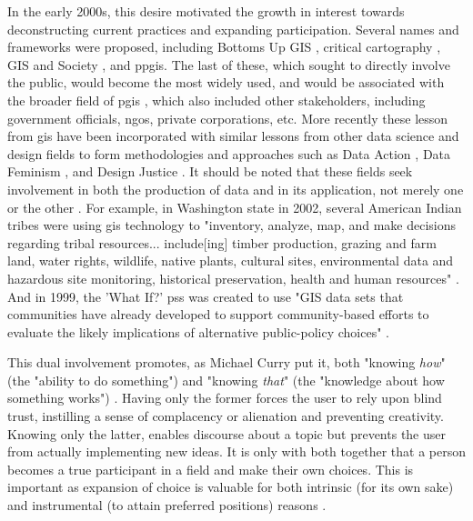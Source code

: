 In the early 2000s, this desire motivated the growth in interest towards deconstructing current practices and expanding participation. Several names and frameworks were proposed, including Bottoms Up GIS \cite{talenBottomUpGIS2000}, critical cartography \cite{cramptonIntroductionCriticalCartography2005, kimCriticalCartographyParticipatory2015}, GIS and Society \cite{sieberPublicParticipationGeographic2006}, and \ac{ppgis}. The last of these, which sought to directly involve the public, would become the most widely used, and would be associated with the broader field of \ac{pgis} \cite{sieberPublicParticipationGeographic2006}, which also included other stakeholders, including government officials, \acp{ngo}, private corporations, etc. More recently these lesson from \ac{gis} have been incorporated with similar lessons from other data science and design fields to form methodologies and approaches such as Data Action \cite{williamsDataActionUsing2020}, Data Feminism \cite{dignazioDataFeminism2020}, and Design Justice \cite{costanza-chockDesignJusticeCommunityLed2020}. It should be noted that these fields seek involvement in both the production of data and in its application, not merely one or the other \cite{weinerParticipatoryGeographicInformation2007, talenBottomUpGIS2000}. For example, in Washington state in 2002, several American Indian tribes were using \ac{gis} technology to "inventory, analyze, map, and make decisions regarding tribal resources... include[ing] timber production, grazing and farm land, water rights, wildlife, native plants, cultural sites, environmental data and hazardous site monitoring, historical preservation, health and human resources" \cite{bondCherokeeNationTribal2002}. And in 1999, the 'What If?' \ac{pss} was created to use "GIS data sets that communities have already developed to support community-based efforts to evaluate the likely implications of alternative public-policy choices" \cite{klostermanWhatIfCollaborative1999}. 

This dual involvement promotes, as Michael Curry put it, both "knowing \textit{how}" (the "ability to do something") and "knowing \textit{that}" (the "knowledge about how something works") \cite{curryGeographicalInformationSystems1994}. Having only the former forces the user to rely upon blind trust, instilling a sense of complacency or alienation and preventing creativity. Knowing only the latter, enables discourse about a topic but prevents the user from actually implementing new ideas. It is only with both together that a person becomes a true participant in a field and make their own choices. This is important as expansion of choice is valuable for both intrinsic (for its own sake) and instrumental (to attain preferred positions) reasons \cite{senFreedomChoiceConcept1988}.

